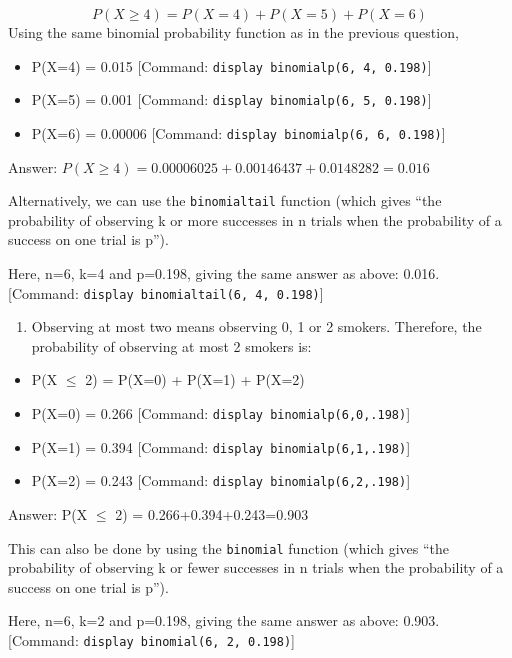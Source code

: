 \documentclass[
]{memoir}
\providecommand{\tightlist}{%
  \setlength{\itemsep}{0pt}\setlength{\parskip}{0pt}}
\begin{document}
\[ P(X \ge 4) = P(X=4) + P(X=5) + P(X=6) \]
Using the same binomial probability function as in the previous question,

\begin{itemize}
\tightlist
\item
  P(X=4) = 0.015 {[}Command: \texttt{display\ binomialp(6,\ 4,\ 0.198)}{]}
\item
  P(X=5) = 0.001 {[}Command: \texttt{display\ binomialp(6,\ 5,\ 0.198)}{]}
\item
  P(X=6) = 0.00006 {[}Command: \texttt{display\ binomialp(6,\ 6,\ 0.198)}{]}
\end{itemize}

Answer: \(P(X \ge 4) = 0.00006025 + 0.00146437 + 0.0148282 = 0.016\)

Alternatively, we can use the \texttt{binomialtail} function (which gives ``the probability of observing k or more successes in n trials when the probability of a success on one trial is p'').

Here, n=6, k=4 and p=0.198, giving the same answer as above: 0.016.
{[}Command: \texttt{display\ binomialtail(6,\ 4,\ 0.198)}{]}

\begin{enumerate}
\def\labelenumi{\alph{enumi})}
\setcounter{enumi}{2}
\tightlist
\item
  Observing at most two means observing 0, 1 or 2 smokers. Therefore, the probability of observing at most 2 smokers is:
\end{enumerate}

\begin{itemize}
\tightlist
\item
  P(X \(\le\) 2) = P(X=0) + P(X=1) + P(X=2)
\item
  P(X=0) = 0.266 {[}Command: \texttt{display\ binomialp(6,0,.198)}{]}
\item
  P(X=1) = 0.394 {[}Command: \texttt{display\ binomialp(6,1,.198)}{]}
\item
  P(X=2) = 0.243 {[}Command: \texttt{display\ binomialp(6,2,.198)}{]}
\end{itemize}

Answer: P(X \(\le\) 2) = 0.266+0.394+0.243=0.903

This can also be done by using the \texttt{binomial} function (which gives ``the probability of observing k or fewer successes in n trials when the probability of a success on one trial is p'').

Here, n=6, k=2 and p=0.198, giving the same answer as above: 0.903.
{[}Command: \texttt{display\ binomial(6,\ 2,\ 0.198)}{]}
\end{document}
